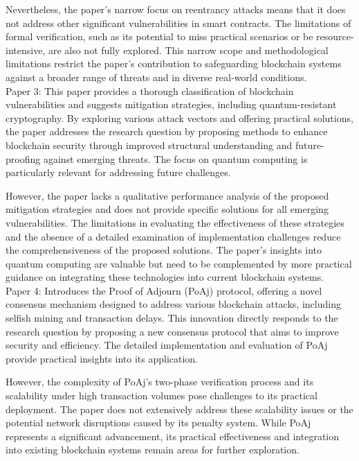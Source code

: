 \documentclass[12pt,a4paper]{article}
\begin{document}
\begin{itemize}
Nevertheless, the paper’s narrow focus on reentrancy attacks means that it does not address other significant vulnerabilities in smart contracts. The limitations of formal verification, such as its potential to miss practical scenarios or be resource-intensive, are also not fully explored. This narrow scope and methodological limitations restrict the paper's contribution to safeguarding blockchain systems against a broader range of threats and in diverse real-world conditions.
\\
Paper 3:
This paper provides a thorough classification of blockchain vulnerabilities and suggests mitigation strategies, including quantum-resistant cryptography. By exploring various attack vectors and offering practical solutions, the paper addresses the research question by proposing methods to enhance blockchain security through improved structural understanding and future-proofing against emerging threats. The focus on quantum computing is particularly relevant for addressing future challenges.

However, the paper lacks a qualitative performance analysis of the proposed mitigation strategies and does not provide specific solutions for all emerging vulnerabilities. The limitations in evaluating the effectiveness of these strategies and the absence of a detailed examination of implementation challenges reduce the comprehensiveness of the proposed solutions. The paper's insights into quantum computing are valuable but need to be complemented by more practical guidance on integrating these technologies into current blockchain systems.
\\
Paper 4:
Introduces the Proof of Adjourn (PoAj) protocol, offering a novel consensus mechanism designed to address various blockchain attacks, including selfish mining and transaction delays. This innovation directly responds to the research question by proposing a new consensus protocol that aims to improve security and efficiency. The detailed implementation and evaluation of PoAj provide practical insights into its application.

However, the complexity of PoAj’s two-phase verification process and its scalability under high transaction volumes pose challenges to its practical deployment. The paper does not extensively address these scalability issues or the potential network disruptions caused by its penalty system. While PoAj represents a significant advancement, its practical effectiveness and integration into existing blockchain systems remain areas for further exploration.


\end{itemize}
\end{document}
